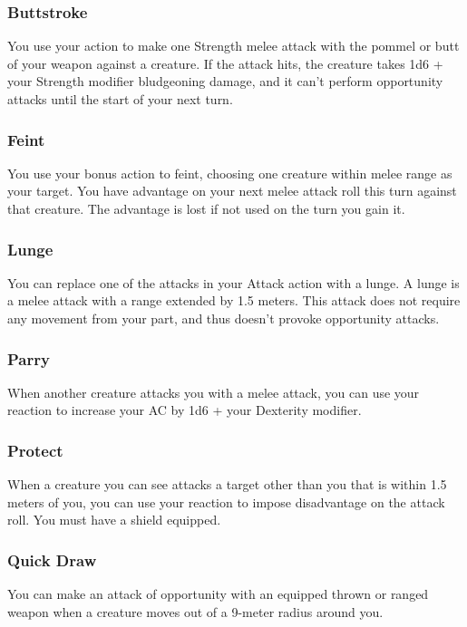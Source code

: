\subsubsection{Buttstroke} \label{tec::buttstroke}
You use your action to make one Strength melee attack with the pommel or butt of your weapon against a creature.
If the attack hits, the creature takes 1d6 + your Strength modifier bludgeoning damage, and it can't perform opportunity attacks until the start of your next turn.

\subsubsection{Feint} \label{tec::feint}
You use your bonus action to feint, choosing one creature within melee range as your target.
You have advantage on your next melee attack roll this turn against that creature.
The advantage is lost if not used on the turn you gain it.

\subsubsection{Lunge} \label{tec::lunge}
You can replace one of the attacks in your Attack action with a lunge.
A lunge is a melee attack with a range extended by 1.5 meters.
This attack does not require any movement from your part, and thus doesn't provoke opportunity attacks.

\subsubsection{Parry} \label{tec::parry}
When another creature attacks you with a melee attack, you can use your reaction to increase your AC by 1d6 + your Dexterity modifier.

\subsubsection{Protect} \label{tec::protect}
When a creature you can see attacks a target other than you that is within 1.5 meters of you, you can use your reaction to impose disadvantage on the attack roll.
You must have a shield equipped.

\subsubsection{Quick Draw} \label{tec::quickdraw}
You can make an attack of opportunity with an equipped thrown or ranged weapon when a creature moves out of a 9-meter radius around you.

